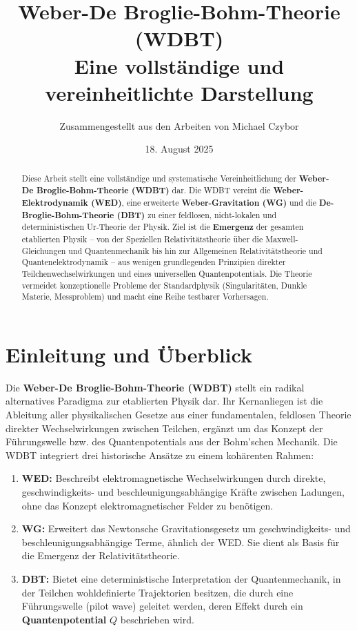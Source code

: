 \documentclass[11pt, a4paper]{article}
\title{Weber-De Broglie-Bohm-Theorie (WDBT) \\ Eine vollständige und vereinheitlichte Darstellung}
\author{Zusammengestellt aus den Arbeiten von Michael Czybor}
\date{18. August 2025}
\begin{document}
\maketitle

\begin{abstract}
Diese Arbeit stellt eine vollständige und systematische Vereinheitlichung der \textbf{Weber-De Broglie-Bohm-Theorie (WDBT)} dar. Die WDBT vereint die \textbf{Weber-Elektrodynamik (WED)}, eine erweiterte \textbf{Weber-Gravitation (WG)} und die \textbf{De-Broglie-Bohm-Theorie (DBT)} zu einer feldlosen, nicht-lokalen und deterministischen Ur-Theorie der Physik. Ziel ist die \textbf{Emergenz} der gesamten etablierten Physik – von der Speziellen Relativitätstheorie über die Maxwell-Gleichungen und Quantenmechanik bis hin zur Allgemeinen Relativitätstheorie und Quantenelektrodynamik – aus wenigen grundlegenden Prinzipien direkter Teilchenwechselwirkungen und eines universellen Quantenpotentials. Die Theorie vermeidet konzeptionelle Probleme der Standardphysik (Singularitäten, Dunkle Materie, Messproblem) und macht eine Reihe testbarer Vorhersagen.
\end{abstract}

\tableofcontents

\section{Einleitung und Überblick}
\label{sec:einleitung}

Die \textbf{Weber-De Broglie-Bohm-Theorie (WDBT)} stellt ein radikal alternatives Paradigma zur etablierten Physik dar. Ihr Kernanliegen ist die Ableitung aller physikalischen Gesetze aus einer fundamentalen, feldlosen Theorie direkter Wechselwirkungen zwischen Teilchen, ergänzt um das Konzept der Führungswelle bzw. des Quantenpotentials aus der Bohm'schen Mechanik. Die WDBT integriert drei historische Ansätze zu einem kohärenten Rahmen:

\begin{enumerate}
    \item \textbf{WED:} Beschreibt elektromagnetische Wechselwirkungen durch direkte, geschwindigkeits- und beschleunigungsabhängige Kräfte zwischen Ladungen, ohne das Konzept elektromagnetischer Felder zu benötigen.
    \item \textbf{WG:} Erweitert das Newtonsche Gravitationsgesetz um geschwindigkeits- und beschleunigungsabhängige Terme, ähnlich der WED. Sie dient als Basis für die Emergenz der Relativitätstheorie.
    \item \textbf{DBT:} Bietet eine deterministische Interpretation der Quantenmechanik, in der Teilchen wohldefinierte Trajektorien besitzen, die durch eine Führungswelle (\glqq pilot wave\grqq) geleitet werden, deren Effekt durch ein \textbf{Quantenpotential} $Q$ beschrieben wird.
\end{enumerate}
\end{document}
